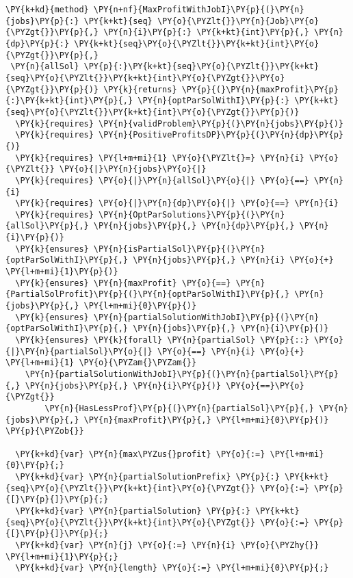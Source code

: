 \begin{Verbatim}[commandchars=\\\{\}, fontsize=\small]
\PY{k+kd}{method} \PY{n+nf}{MaxProfitWithJobI}\PY{p}{(}\PY{n}{jobs}\PY{p}{:} \PY{k+kt}{seq} \PY{o}{\PYZlt{}}\PY{n}{Job}\PY{o}{\PYZgt{}}\PY{p}{,} \PY{n}{i}\PY{p}{:} \PY{k+kt}{int}\PY{p}{,} \PY{n}{dp}\PY{p}{:} \PY{k+kt}{seq}\PY{o}{\PYZlt{}}\PY{k+kt}{int}\PY{o}{\PYZgt{}}\PY{p}{,}
 \PY{n}{allSol} \PY{p}{:}\PY{k+kt}{seq}\PY{o}{\PYZlt{}}\PY{k+kt}{seq}\PY{o}{\PYZlt{}}\PY{k+kt}{int}\PY{o}{\PYZgt{}}\PY{o}{\PYZgt{}}\PY{p}{)} \PY{k}{returns} \PY{p}{(}\PY{n}{maxProfit}\PY{p}{:}\PY{k+kt}{int}\PY{p}{,} \PY{n}{optParSolWithI}\PY{p}{:} \PY{k+kt}{seq}\PY{o}{\PYZlt{}}\PY{k+kt}{int}\PY{o}{\PYZgt{}}\PY{p}{)}
  \PY{k}{requires} \PY{n}{validProblem}\PY{p}{(}\PY{n}{jobs}\PY{p}{)}
  \PY{k}{requires} \PY{n}{PositiveProfitsDP}\PY{p}{(}\PY{n}{dp}\PY{p}{)}
  \PY{k}{requires} \PY{l+m+mi}{1} \PY{o}{\PYZlt{}=} \PY{n}{i} \PY{o}{\PYZlt{}} \PY{o}{|}\PY{n}{jobs}\PY{o}{|}
  \PY{k}{requires} \PY{o}{|}\PY{n}{allSol}\PY{o}{|} \PY{o}{==} \PY{n}{i}
  \PY{k}{requires} \PY{o}{|}\PY{n}{dp}\PY{o}{|} \PY{o}{==} \PY{n}{i}
  \PY{k}{requires} \PY{n}{OptParSolutions}\PY{p}{(}\PY{n}{allSol}\PY{p}{,} \PY{n}{jobs}\PY{p}{,} \PY{n}{dp}\PY{p}{,} \PY{n}{i}\PY{p}{)}
  \PY{k}{ensures} \PY{n}{isPartialSol}\PY{p}{(}\PY{n}{optParSolWithI}\PY{p}{,} \PY{n}{jobs}\PY{p}{,} \PY{n}{i} \PY{o}{+} \PY{l+m+mi}{1}\PY{p}{)}
  \PY{k}{ensures} \PY{n}{maxProfit} \PY{o}{==} \PY{n}{PartialSolProfit}\PY{p}{(}\PY{n}{optParSolWithI}\PY{p}{,} \PY{n}{jobs}\PY{p}{,} \PY{l+m+mi}{0}\PY{p}{)}
  \PY{k}{ensures} \PY{n}{partialSolutionWithJobI}\PY{p}{(}\PY{n}{optParSolWithI}\PY{p}{,} \PY{n}{jobs}\PY{p}{,} \PY{n}{i}\PY{p}{)}
  \PY{k}{ensures} \PY{k}{forall} \PY{n}{partialSol} \PY{p}{::} \PY{o}{|}\PY{n}{partialSol}\PY{o}{|} \PY{o}{==} \PY{n}{i} \PY{o}{+} \PY{l+m+mi}{1} \PY{o}{\PYZam{}\PYZam{}} 
    \PY{n}{partialSolutionWithJobI}\PY{p}{(}\PY{n}{partialSol}\PY{p}{,} \PY{n}{jobs}\PY{p}{,} \PY{n}{i}\PY{p}{)} \PY{o}{==}\PY{o}{\PYZgt{}}
        \PY{n}{HasLessProf}\PY{p}{(}\PY{n}{partialSol}\PY{p}{,} \PY{n}{jobs}\PY{p}{,} \PY{n}{maxProfit}\PY{p}{,} \PY{l+m+mi}{0}\PY{p}{)}
\PY{p}{\PYZob{}}

  \PY{k+kd}{var} \PY{n}{max\PYZus{}profit} \PY{o}{:=} \PY{l+m+mi}{0}\PY{p}{;}
  \PY{k+kd}{var} \PY{n}{partialSolutionPrefix} \PY{p}{:} \PY{k+kt}{seq}\PY{o}{\PYZlt{}}\PY{k+kt}{int}\PY{o}{\PYZgt{}} \PY{o}{:=} \PY{p}{[}\PY{p}{]}\PY{p}{;}
  \PY{k+kd}{var} \PY{n}{partialSolution} \PY{p}{:} \PY{k+kt}{seq}\PY{o}{\PYZlt{}}\PY{k+kt}{int}\PY{o}{\PYZgt{}} \PY{o}{:=} \PY{p}{[}\PY{p}{]}\PY{p}{;}
  \PY{k+kd}{var} \PY{n}{j} \PY{o}{:=} \PY{n}{i} \PY{o}{\PYZhy{}} \PY{l+m+mi}{1}\PY{p}{;}
  \PY{k+kd}{var} \PY{n}{length} \PY{o}{:=} \PY{l+m+mi}{0}\PY{p}{;}


\end{Verbatim}
